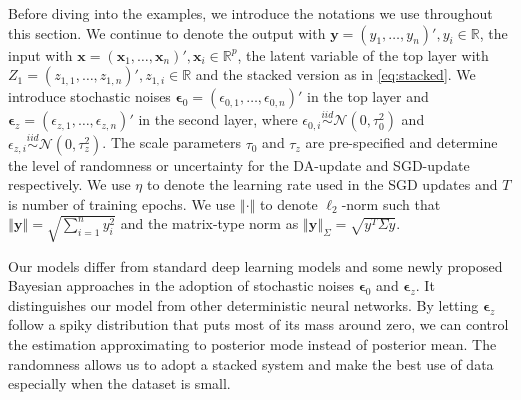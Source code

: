 \documentclass[ba]{imsart}
\newcommand{\bm}[1]{\boldsymbol{#1}}
\newcommand{\iid}{\stackrel{iid}{\sim}}
\newcommand{\norm}[1]{\left\Vert#1\right\Vert}
\def\x{\bm{x}}
\def\y{\bm{y}}
\def\mN{\mathcal{N}}
\newcommand{\bepsilon}{{\bm \epsilon}}
\newcommand{\R}{\mathbb{R}}
\numberwithin{equation}{section}
\theoremstyle{plain}
\begin{document}
Before diving into the examples, we introduce the notations we use throughout this section. We continue to denote the output with $\y=(y_1, \ldots, y_n)', y_i\in \R$, the input with $\x=(\x_1, \ldots, \x_n)', \x_i \in \R^p $, the latent variable of the top layer  with $Z_1=(z_{1,1}, \ldots, z_{1,n})', z_{1,i}\in \R$ and the stacked version as in \eqref{eq:stacked}. We introduce stochastic noises $\bepsilon_{0}=(\epsilon_{0,1}, \ldots, \epsilon_{0,n})'$ in the top layer and $\bepsilon_{z}=(\epsilon_{z,1}, \ldots, \epsilon_{z,n})'$ in the second layer, where $\epsilon_{0,i}\iid\mN(0, \tau_0^2)$ and $\epsilon_{z,i}\iid \mN(0, \tau_z^2)$. The scale parameters $\tau_0$ and $\tau_z$ are pre-specified and determine the level of randomness or uncertainty for the DA-update and SGD-update respectively. We use $\eta$ to denote the learning rate used in the SGD updates and $T$ is number of  training epochs. We use $\norm{\cdot}$ to denote $\ell_2$-norm such that $\norm{\y}=\sqrt{\sum_{i=1}^n y_i^2}$ and the matrix-type norm as $\norm{\y}_\Sigma=\sqrt{ y^T \Sigma y}$.

Our models differ from standard deep learning models and some newly proposed Bayesian approaches in the adoption of stochastic noises $\bepsilon_0$ and $\bepsilon_z$. It distinguishes our model from other deterministic neural networks. By letting $\bepsilon_z$ follow a spiky distribution that puts most of its mass around zero,  we can control the estimation approximating to posterior mode instead of posterior mean. The randomness allows us to adopt a stacked system and make the best use of data especially when the dataset is small. 
\end{document}
